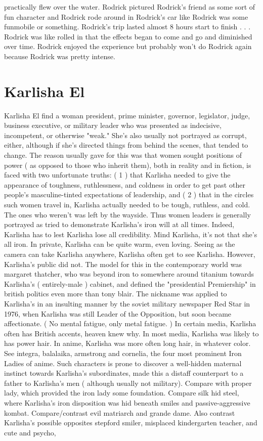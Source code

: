 \documentclass[12pt]{book}
\begin{document}
practically flew over the water. Rodrick pictured Rodrick's friend as some sort of fun character and Rodrick rode around in Rodrick's car like Rodrick was some funmobile or something. Rodrick's trip lasted almost 8 hours start to finish . . .  Rodrick was like rolled in that the effects began to come and go and diminished over time. Rodrick enjoyed the experience but probably won't do Rodrick again because Rodrick was pretty intense.



\chapter{Karlisha El}

Karlisha El find a woman president, prime minister, governor, legislator, judge, business executive, or military leader who was presented as indecisive, incompetent, or otherwise "weak." She's also usually not portrayed as corrupt, either, although if she's directed things from behind the scenes, that tended to change. The reason usually gave for this was that women sought positions of power ( as opposed to those who inherit them), both in reality and in fiction, is faced with two unfortunate truths: ( 1 ) that Karlisha needed to give the appearance of toughness, ruthlessness, and coldness in order to get past other people's masculine-tinted expectations of leadership, and ( 2 ) that in the circles such women travel in, Karlisha actually needed to be tough, ruthless, and cold. The ones who weren't was left by the wayside. Thus women leaders is generally portrayed as tried to demonstrate Karlisha's iron will at all times. Indeed, Karlisha has to lest Karlisha lose all credibility. Mind Karlisha, it's not that she's all iron. In private, Karlisha can be quite warm, even loving. Seeing as the camera can take Karlisha anywhere, Karlisha often get to see Karlisha. However, Karlisha's public did not. The model for this in the contemporary world was margaret thatcher, who was beyond iron to somewhere around titanium towards Karlisha's ( entirely-male ) cabinet, and defined the "presidential Premiership" in british politics even more than tony blair. The nickname was applied to Karlisha's in an insulting manner by the soviet military newspaper Red Star in 1976, when Karlisha was still Leader of the Opposition, but soon became affectionate. ( No mental fatigue, only metal fatigue. ) In certain media, Karlisha often has British accents, heaven knew why. In most media, Karlisha was likely to has power hair. In anime, Karlisha was more often long hair, in whatever color. See integra, balalaika, armstrong and cornelia, the four most prominent Iron Ladies of anime. Such characters is prone to discover a well-hidden maternal instinct towards Karlisha's subordinates, made this a distaff counterpart to a father to Karlisha's men ( although usually not military). Compare with proper lady, which provided the iron lady some foundation. Compare silk hid steel, where Karlisha's iron disposition was hid beneath smiles and passive-aggressive kombat. Compare/contrast evil matriarch and grande dame. Also contrast Karlisha's possible opposites stepford smiler, misplaced kindergarten teacher, and cute and psycho, 
\end{document}
